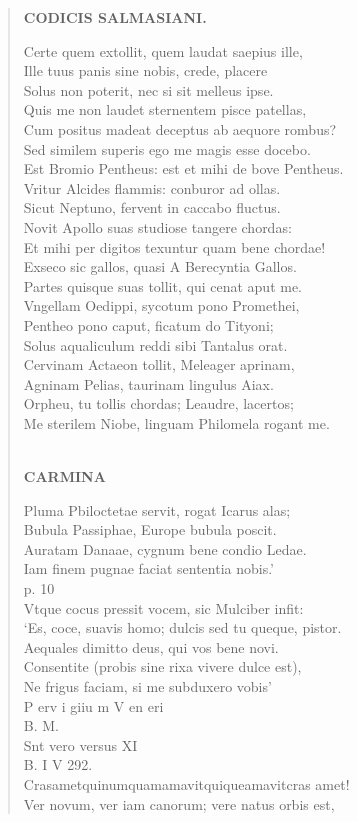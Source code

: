\documentclass[11pt, a4paper]{report}
\begin{document}
\begin{verse}
    \begin{center} \textbf{CODICIS SALMASIANI.} \end{center} \marginpar{[169]} Certe quem extollit, quem laudat saepius ille, \\ Ille tuus panis sine nobis, crede, placere \\ Solus non poterit, nec si sit melleus ipse. \\ Quis me non laudet sternentem pisce patellas, \\ Cum positus madeat deceptus ab aequore rombus? \\ Sed similem superis ego me magis esse docebo. \\ Est Bromio Pentheus: est et mihi de bove Pentheus. \\ Vritur Alcides flammis: conburor ad ollas. \\ Sicut Neptuno, fervent in caccabo fluctus. \\ Novit Apollo suas studiose tangere chordas: \\ Et mihi per digitos texuntur quam bene chordae! \\ Exseco sic gallos, quasi A Berecyntia Gallos. \\ Partes quisque suas tollit, qui cenat aput me. \\ Vngellam Oedippi, sycotum pono Promethei, \\ Pentheo pono caput, ficatum do Tityoni; \\ Solus aqualiculum reddi sibi Tantalus orat. \\ Cervinam Actaeon tollit, Meleager aprinam, \\ Agninam Pelias, taurinam lingulus Aiax. \\ Orpheu, tu tollis chordas; Leaudre, lacertos; \\ Me sterilem Niobe, linguam Philomela rogant me. \\ 
        ﻿\pagebreak 
    \begin{center} \textbf{CARMINA} \end{center} \marginpar{[170]} Pluma Pbiloctetae servit, rogat Icarus alas; \\ Bubula Passiphae, Europe bubula poscit. \\ Auratam Danaae, cygnum bene condio Ledae. \\ Iam finem pugnae faciat sententia nobis.’ \\ p. 10 \\ Vtque cocus pressit vocem, sic Mulciber infit: \\ ‘Es, coce, suavis homo; dulcis sed tu queque, pistor. \\ Aequales dimitto deus, qui vos bene novi. \\ Consentite (probis sine rixa vivere dulce est), \\ Ne frigus faciam, si me subduxero vobis’ \\ P erv i giiu m V en eri \\ B. M. \\ Snt vero versus XI \\ B. I V 292. \\ Crasametquinumquamamavitquiqueamavitcras amet! \\ Ver novum, ver iam canorum; vere natus orbis est, \\ 

\end{verse}
\end{document}
